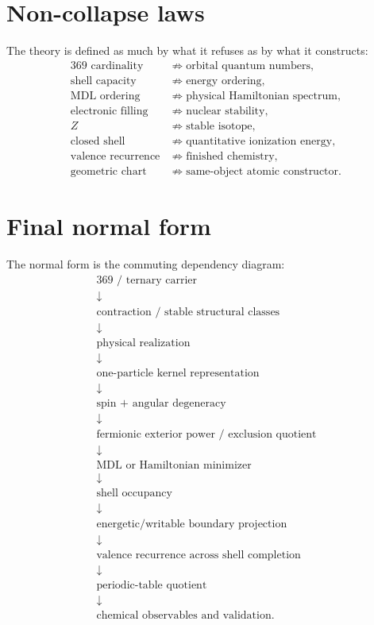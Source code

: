 \documentclass[11pt,a4paper]{article}
\theoremstyle{remark}
\begin{document}
\section{Non-collapse laws}

The theory is defined as much by what it refuses as by what it constructs:
\[
\boxed{
\begin{aligned}
369\text{ cardinality} &\not\Rightarrow \text{orbital quantum numbers},\\
\text{shell capacity} &\not\Rightarrow \text{energy ordering},\\
\text{MDL ordering} &\not\Rightarrow \text{physical Hamiltonian spectrum},\\
\text{electronic filling} &\not\Rightarrow \text{nuclear stability},\\
Z &\not\Rightarrow \text{stable isotope},\\
\text{closed shell} &\not\Rightarrow \text{quantitative ionization energy},\\
\text{valence recurrence} &\not\Rightarrow \text{finished chemistry},\\
\text{geometric chart} &\not\Rightarrow \text{same-object atomic constructor}.
\end{aligned}}
\]

\section{Final normal form}

The normal form is the commuting dependency diagram:
\[
\boxed{
\begin{array}{c}
\text{369 / ternary carrier}\\
\downarrow\\
\text{contraction / stable structural classes}\\
\downarrow\\
\text{physical realization}\\
\downarrow\\
\text{one-particle kernel representation}\\
\downarrow\\
\text{spin + angular degeneracy}\\
\downarrow\\
\text{fermionic exterior power / exclusion quotient}\\
\downarrow\\
\text{MDL or Hamiltonian minimizer}\\
\downarrow\\
\text{shell occupancy}\\
\downarrow\\
\text{energetic/writable boundary projection}\\
\downarrow\\
\text{valence recurrence across shell completion}\\
\downarrow\\
\text{periodic-table quotient}\\
\downarrow\\
\text{chemical observables and validation}.
\end{array}}
\]
\end{document}
